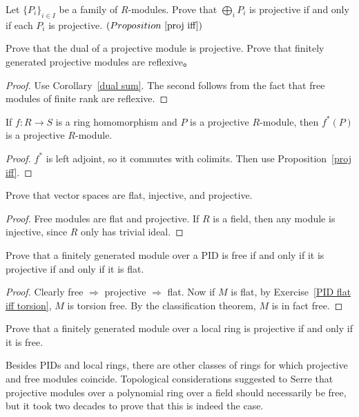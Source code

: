 \begin{exercise}
Let $\{P_i\}_{i\in I}$ be a family of $R$-modules. Prove that $\bigoplus_iP_i$ is projective if and
only if each $P_i$ is projective. $(Proposition~\ref{proj iff})$
\end{exercise}
\begin{exercise}
Prove that the dual of a projective module is projective. Prove that finitely generated projective modules are reflexive。
\end{exercise}
\begin{proof}
Use Corollary~\ref{dual sum}. The second follows from the fact that free modules of finite rank are reflexive.
\end{proof}
\begin{exercise}
If $f:R\to S$ is a ring homomorphism and $P$ is a projective $R$-module, then $f^*(P)$ is a projective $R$-module.
\end{exercise}
\begin{proof}
$f^*$ is left adjoint, so it commutes with colimits. Then use Proposition~\ref{proj iff}.
\end{proof}
\begin{exercise}
Prove that vector spaces are flat, injective, and projective.
\end{exercise}
\begin{proof}
Free modules are flat and projective. If $R$ is a field, then any module is injective, since $R$ only has trivial ideal.
\end{proof}
\begin{exercise}
Prove that a finitely generated module over a PID is free if and only if it is projective if and only if it is flat.
\end{exercise}
\begin{proof}
Clearly free $\Rightarrow$ projective $\Rightarrow$ flat. Now if $M$ is flat, by Exercise~\ref{PID flat iff torsion}, $M$ is torsion free. By the classification theorem, $M$ is in fact free.
\end{proof}
\begin{exercise}\label{local ring pro iff free}
Prove that a finitely generated module over a local ring is projective if and
only if it is free.\par
Besides PIDs and local rings, there are other classes of rings for which projective and free modules coincide. Topological considerations suggested to Serre that projective modules over a polynomial ring over a field should necessarily be free, but it took two decades to prove that this is indeed the case.
\end{exercise}
